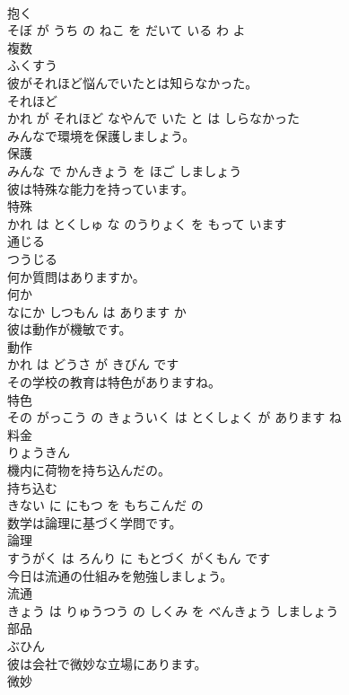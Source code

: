\documentclass[8pt]{extreport}
\begin{document}
\begin{CJK}{UTF8}{min}
\\	抱く 
\\	そぼ が うち の ねこ を だいて いる わ よ			
\\	複数	
\\	ふくすう			
\\	彼がそれほど悩んでいたとは知らなかった。	
\\	それほど 
\\	かれ が それほど なやんで いた と は しらなかった			
\\	みんなで環境を保護しましょう。	
\\	保護 
\\	みんな で かんきょう を ほご しましょう			
\\	彼は特殊な能力を持っています。	
\\	特殊 
\\	かれ は とくしゅ な のうりょく を もって います			
\\	通じる	
\\	つうじる			
\\	何か質問はありますか。	
\\	何か 
\\	なにか しつもん は あります か			
\\	彼は動作が機敏です。	
\\	動作 
\\	かれ は どうさ が きびん です			
\\	その学校の教育は特色がありますね。	
\\	特色 
\\	その がっこう の きょういく は とくしょく が あります ね			
\\	料金	
\\	りょうきん			
\\	機内に荷物を持ち込んだの。	
\\	持ち込む 
\\	きない に にもつ を もちこんだ の			
\\	数学は論理に基づく学問です。	
\\	論理 
\\	すうがく は ろんり に もとづく がくもん です			
\\	今日は流通の仕組みを勉強しましょう。	
\\	流通 
\\	きょう は りゅうつう の しくみ を べんきょう しましょう			
\\	部品	
\\	ぶひん			
\\	彼は会社で微妙な立場にあります。	
\\	微妙 

\end{CJK}
\end{document}
